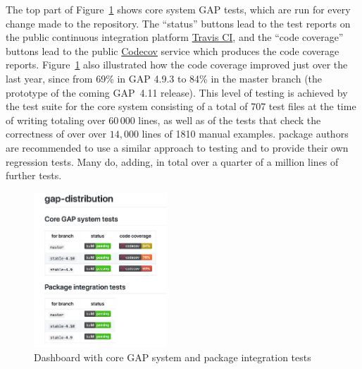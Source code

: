 The top part of Figure~\ref{fig:gap-core-tests} shows core system GAP tests,
which are run for every change made to the repository.
The ``status'' buttons lead to the test reports on the
public continuous integration platform \href{https://travis-ci.org/}{Travis CI}, and
the ``code coverage'' buttons lead to the public \href{https://codecov.io/}{Codecov} service
which produces the code coverage reports. Figure~\ref{fig:gap-core-tests} also
illustrated how the code coverage improved just over the last year,
since from 69\% in GAP 4.9.3 to 84\% in the master branch
(the prototype of the coming GAP~4.11 release). This level of testing
is achieved by the \GAP test 
suite for the core system consisting of a total of 707 test files at the time of writing
totaling over $60\,000$ lines,
as well as of the tests that check the correctness of over
over $14,000$ lines of 1810 manual examples.
%
\GAP package authors are recommended to 
use a similar approach to testing and to provide their own regression
tests. Many do, adding, in total over a quarter of a million lines of
further tests.

\begin{figure}[!ht]
    \centering
    \includegraphics[width=5cm]{images/gap-core-tests}
    \caption{Dashboard with core GAP system and package integration tests}
    \label{fig:gap-core-tests}
\end{figure}

